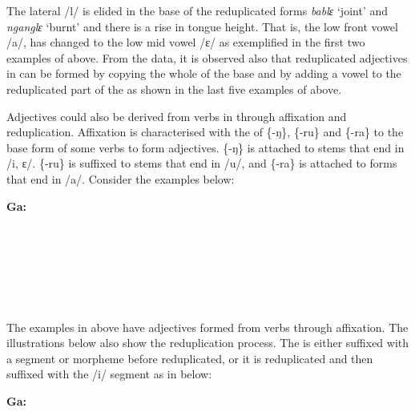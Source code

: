 \documentclass[output=paper,
modfonts
]{langscibook}
\begin{document}
The lateral /l/ is elided in the base of the reduplicated forms \textit{bablɛ} ‘joint’ and \textit{nganglɛ} ‘burnt’ and there is a rise in tongue height. That is, the low front vowel /a/, has changed to the low mid vowel /ɛ/ as exemplified in the first two examples of  above. From the data, it is observed also that reduplicated adjectives in  can be formed by copying the whole of the base and by adding a vowel to the reduplicated part of the  as shown in the last five examples of  above.



Adjectives could also be derived from verbs in  through affixation and reduplication. Affixation is characterised with the  of \{-ŋ\}, \{-ru\} and \{-ra\} to the base form of some verbs to form adjectives. \{-ŋ\} is attached to  stems that end in /i, ɛ/. \{-ru\} is suffixed to  stems that end in /u/, and \{-ra\} is attached to  forms that end in /a/. Consider the  examples below:


\ea\label{ex:caesar:3}
\textbf{Ga:} \\
\\ 
\\ 
\\ 
\\ 
\\ 
\\  
\z




The  examples in  above have adjectives formed from verbs through affixation. The illustrations below also show the reduplication process. The  is either suffixed with a segment or morpheme before reduplicated, or it is reduplicated and then suffixed with the /i/ segment as in  below: 


\ea\label{ex:caesar:4}
\textbf{Ga:} \\
\\
\\
\\ 
\z
\end{document}
